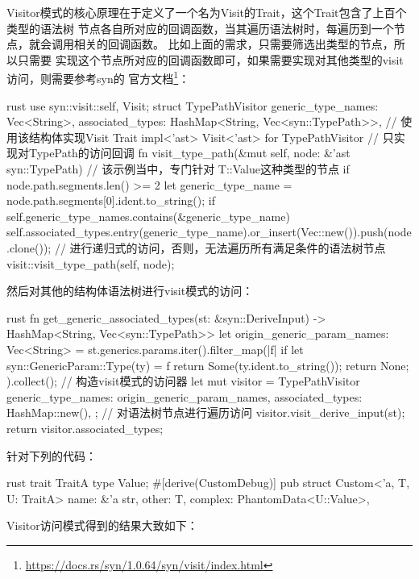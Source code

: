 Visitor模式的核心原理在于定义了一个名为Visit的Trait，这个Trait包含了上百个类型的语法树
节点各自所对应的回调函数，当其遍历语法树时，每遍历到一个节点，就会调用相关的回调函数。
比如上面的需求，只需要筛选出类型的节点，所以只需要
实现这个节点所对应的回调函数即可，如果需要实现对其他类型的visit访问，则需要参考syn的
官方文档\footnote{\url{https://docs.rs/syn/1.0.64/syn/visit/index.html}}：
\begin{code-block}{rust}
use syn::visit::{self, Visit};
struct TypePathVisitor {
    generic_type_names: Vec<String>,
    associated_types: HashMap<String, Vec<syn::TypePath>>,
}
// 使用该结构体实现Visit Trait
impl<'ast> Visit<'ast> for TypePathVisitor {
    // 只实现对TypePath的访问回调
    fn visit_type_path(&mut self, node: &'ast syn::TypePath) {
        // 该示例当中，专门针对 T::Value这种类型的节点
        if node.path.segments.len() >= 2 {
            let generic_type_name = node.path.segments[0].ident.to_string();
            if self.generic_type_names.contains(&generic_type_name) {
                self.associated_types.entry(generic_type_name).or_insert(Vec::new()).push(node.clone());
            }
        }
        // 进行递归式的访问，否则，无法遍历所有满足条件的语法树节点
        visit::visit_type_path(self, node);
    }
}
\end{code-block}
然后对其他的结构体语法树进行visit模式的访问：
\begin{code-block}{rust}
fn get_generic_associated_types(st: &syn::DeriveInput) -> HashMap<String, Vec<syn::TypePath>> {
    let origin_generic_param_names: Vec<String> = st.generics.params.iter().filter_map(|f| {
            if let syn::GenericParam::Type(ty) = f {
                return Some(ty.ident.to_string());
            }
            return None;
        }).collect();
    // 构造visit模式的访问器
    let mut visitor = TypePathVisitor {
        generic_type_names: origin_generic_param_names,
        associated_types: HashMap::new(),
    };
    // 对语法树节点进行遍历访问
    visitor.visit_derive_input(st);
    return visitor.associated_types;
}
\end{code-block}
针对下列的代码：
\begin{code-block}{rust}
trait TraitA { type Value; }
#[derive(CustomDebug)]
pub struct Custom<'a, T, U: TraitA> {
    name: &'a str,
    other: T,
    complex: PhantomData<U::Value>,
}
\end{code-block}
Visitor访问模式得到的结果大致如下：
